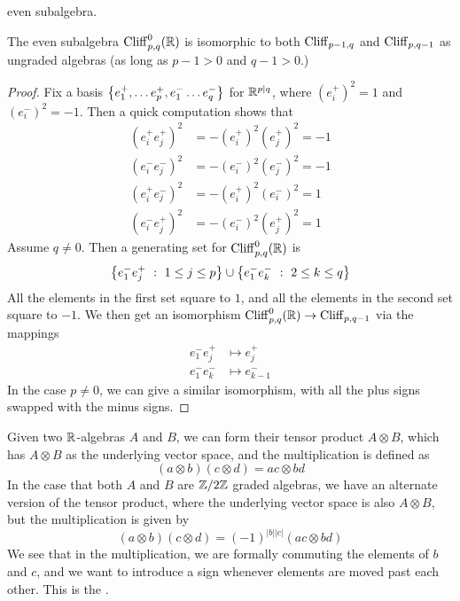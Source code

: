 even subalgebra.
%
\begin{thm}
The even subalgebra $\operatorname{Cliff}_{p,q}^0(\mathbb{R})$ is isomorphic to both $\operatorname{Cliff}_{p-1,q}$
and $\operatorname{Cliff}_{p,q-1}$ as ungraded algebras (as long as $p-1 > 0$ and $q-1 > 0$.)
\end{thm}
%
\begin{proof}
Fix a basis $\left\lbrace e_1^+, \ldots e_p^+, e_1^- \ldots e_q^- \right\rbrace$ for $\mathbb{R}^{p|q}$, where
$(e_i^+)^2 = 1$ and $(e_i^-)^2 = -1$. Then a quick computation shows that
%
\begin{align*}
(e_i^+e_j^+)^2 &= -(e_i^+)^2(e_j^+)^2 = -1 \\
(e_i^-e_j^-)^2 &= -(e_i^-)^2(e_j^-)^2 = -1 \\
(e_i^+e_j^-)^2 &= -(e_i^+)^2(e_i^-)^2 = 1 \\
(e_i^-e_j^+)^2 &= -(e_i^-)^2(e_j^+)^2 = 1
\end{align*}
%
Assume $q \neq 0$. Then a generating set for $\operatorname{Cliff}_{p,q}^0(\mathbb{R})$ is
\[
\left\lbrace e_1^-e_j^+ ~:~ 1 \leq j \leq p \right\rbrace \cup \left\lbrace e_1^-e_k^- ~:~ 2 \leq k \leq q \right\rbrace
\]
All the elements in the first set square to $1$, and all the elements in the
second set square to $-1$. We then get an isomorphism
$\operatorname{Cliff}^0_{p,q}(\mathbb{R}) \to \operatorname{Cliff}_{p,q-1}$ via the mappings
\begin{align*}
e_1^-e_j^+ &\mapsto e_j^+ \\
e_1^-e_k^- &\mapsto e_{k-1}^-
\end{align*}
In the case $p \neq 0$, we can give a similar isomorphism, with all the plus
signs swapped with the minus signs.
\end{proof}
%
Given two $\mathbb{R}$-algebras $A$ and $B$, we can form their tensor product
$A \otimes B$, which has $A \otimes B$ as the underlying vector space, and the
multiplication is defined as
\[
(a \otimes b)(c \otimes d) = ac \otimes bd
\]
In the case that both $A$ and $B$ are $\mathbb{Z}/2\mathbb{Z}$ graded algebras, we have an alternate
version of the tensor product, where the underlying vector space is also
$A \otimes B$, but the multiplication is given by
\[
(a \otimes b)(c \otimes d) = (-1)^{|b||c|}(ac \otimes bd)
\]
We see that in the multiplication, we are formally commuting the elements of
$b$ and $c$, and we want to introduce a sign whenever elements are moved past
each other. This is the .\\

